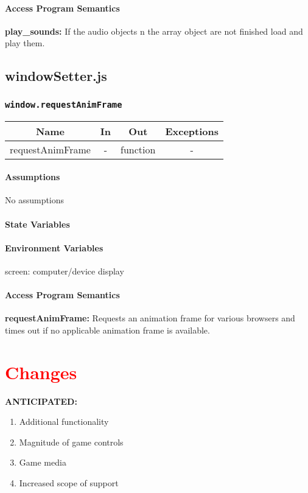 \documentclass[11pt, oneside]{article}   	%
\begin{document}
\paragraph{Access Program Semantics} 
 \textbf{play\_sounds:} If the audio objects n the array object are not finished load and play them.
 
 
 
 

\subsection{windowSetter.js}
\subsubsection{\texttt{window.requestAnimFrame}}
\begin{center}
\begin{tabular}{ |c|c|c|c| } 
 \hline
 Name & In & Out & Exceptions \\ 
 \hline \hline
 requestAnimFrame & - & function & - \\ 
 \hline
\end{tabular}
\end{center}

\paragraph{Assumptions}
No assumptions

\paragraph{State Variables}
\paragraph{Environment Variables}
screen: computer/device display

\paragraph{Access Program Semantics} 
 \textbf{requestAnimFrame:} Requests an animation frame for various browsers and times out if no applicable animation frame is available.

\section{\textcolor{red}{Changes}}
\textbf{ANTICIPATED:}
\begin{enumerate}
\item Additional functionality
\item Magnitude of game controls
\item Game media
\item Increased scope of support
\end{enumerate}
\end{document}
